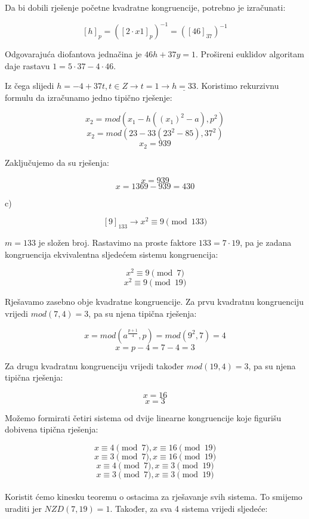 \documentclass[12pt]{article}
\begin{document}
Da bi dobili rješenje početne kvadratne kongruencije, potrebno je izračunati:

$$[h]_{p} = ([2\cdot x1]_{p})^{-1} = ([46]_{37})^{-1}$$\vspace{1mm}

Odgovarajuća diofantova jednačina je $46h + 37y = 1$. Prošireni euklidov algoritam daje rastavu $1 = 5 \cdot 37 - 4 \cdot 46$.

Iz čega slijedi $h = -4 + 37t, t \in Z \to t = 1 \to \underline{h = 33}$. Koristimo rekurzivnu formulu da izračunamo jedno tipično rješenje:

$$x_{2} = mod(x_{1} - h((x_{1})^2 - a), p^2)$$
$$x_{2} = mod(23 - 33(23^2 - 85), 37^2)$$
$$x_{2} = 939$$\vspace{1mm}

Zaključujemo da su rješenja:

$$x = 939$$
$$x = 1369 - 939 = 430$$\vspace{1mm}

c)

$$[9]_{133} \to x^2\equiv 9 \pmod{133}$$\vspace{1mm}

$m = 133$ je složen broj. Rastavimo na proste faktore $133 = 7 \cdot 19$, pa je zadana kongruencija ekvivalentna sljedećem sistemu kongruencija:

$$x^2 \equiv 9 \pmod{7}$$
$$x^2 \equiv 9 \pmod{19}$$\vspace{1mm}

Rješavamo zasebno obje kvadratne kongruencije. Za prvu kvadratnu kongruenciju vrijedi $mod(7, 4) = 3$, pa su njena tipična rješenja:

$$x = mod(a^{\frac{p + 1}{4}}, p) = mod(9^2, 7) = 4$$
$$x = p - 4 = 7 - 4 = 3$$\vspace{1mm}

Za drugu kvadratnu kongruenciju vrijedi također $mod(19, 4) = 3$, pa su njena tipična rješenja:

$$x = 16$$
$$x = 3$$\vspace{1mm}

Možemo formirati četiri sistema od dvije linearne kongruencije koje figurišu dobivena tipična rješenja:

\[
x \equiv 4 \pmod{7}, x \equiv 16 \pmod{19} \label{eq:Z6eq1} \tag{1}
\]
\[
x \equiv 3 \pmod{7}, x \equiv 16 \pmod{19} \label{eq:Z6eq2} \tag{2}
\]
\[
x \equiv 4 \pmod{7}, x \equiv 3 \pmod{19} \label{eq:Z6eq3} \tag{3}
\]
\[
x \equiv 3 \pmod{7}, x \equiv 3 \pmod{19} \label{eq:Z6eq4} \tag{4}
\]
\\
Koristit ćemo kinesku teoremu o ostacima za rješavanje svih sistema. To smijemo uraditi jer $NZD(7, 19) = 1$. Također, za sva 4 sistema vrijedi sljedeće:
\end{document}
